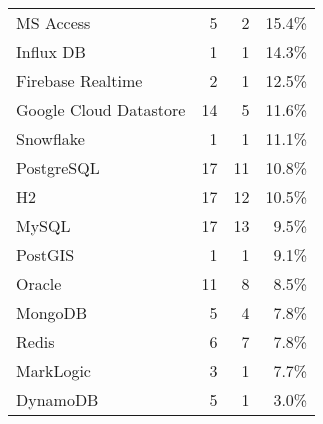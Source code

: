 \begin{tabular}{lrrr}
             MS Access &                        5 &                    2 &                15.4\% \\
             Influx DB &                        1 &                    1 &                14.3\% \\
     Firebase Realtime &                        2 &                    1 &                12.5\% \\
Google Cloud Datastore &                       14 &                    5 &                11.6\% \\
             Snowflake &                        1 &                    1 &                11.1\% \\
            PostgreSQL &                       17 &                   11 &                10.8\% \\
                    H2 &                       17 &                   12 &                10.5\% \\
                 MySQL &                       17 &                   13 &                 9.5\% \\
               PostGIS &                        1 &                    1 &                 9.1\% \\
                Oracle &                       11 &                    8 &                 8.5\% \\
               MongoDB &                        5 &                    4 &                 7.8\% \\
                 Redis &                        6 &                    7 &                 7.8\% \\
             MarkLogic &                        3 &                    1 &                 7.7\% \\
              DynamoDB &                        5 &                    1 &                 3.0\% \\
\hline
\end{tabular}
